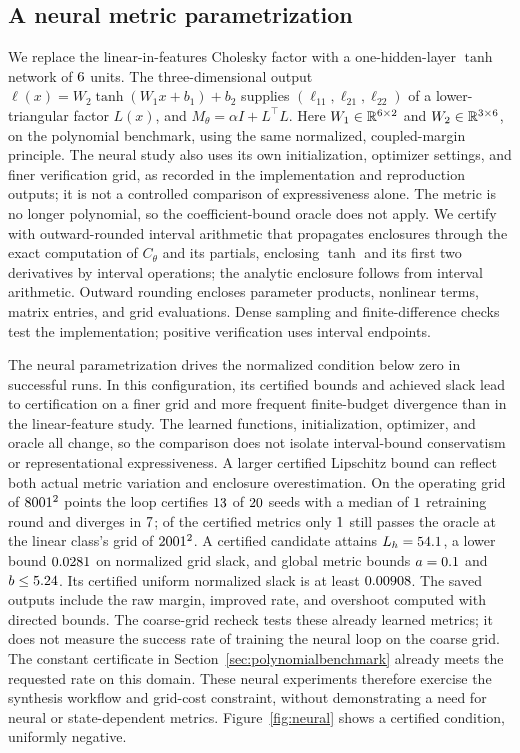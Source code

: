 \documentclass[12pt,onecolumn,journal]{IEEEtran}
\newcommand{\R}{\mathbb{R}}
\begin{document}
\subsection{A neural metric parametrization}
\label{sec:neural}

We replace the linear-in-features Cholesky factor with a one-hidden-layer $\tanh$ network of $6$ units. The three-dimensional output $\ell(x)=W_2\tanh(W_1x+b_1)+b_2$ supplies $(\ell_{11},\ell_{21},\ell_{22})$ of a lower-triangular factor $L(x)$, and $M_\theta=\alpha I+L^\top L$. Here $W_1\in\R^{\numNeuralUnits\times2}$ and $W_2\in\R^{3\times\numNeuralUnits}$, on the polynomial benchmark, using the same normalized, coupled-margin principle. The neural study also uses its own initialization, optimizer settings, and finer verification grid, as recorded in the implementation and reproduction outputs; it is not a controlled comparison of expressiveness alone. The metric is no longer polynomial, so the coefficient-bound oracle does not apply. We certify with outward-rounded interval arithmetic that propagates enclosures through the exact computation of $C_\theta$ and its partials, enclosing $\tanh$ and its first two derivatives by interval operations; the analytic enclosure follows from interval arithmetic. Outward rounding encloses parameter products, nonlinear terms, matrix entries, and grid evaluations. Dense sampling and finite-difference checks test the implementation; positive verification uses interval endpoints.

The neural parametrization drives the normalized condition below zero in successful runs. In this configuration, its certified bounds and achieved slack lead to certification on a finer grid and more frequent finite-budget divergence than in the linear-feature study. The learned functions, initialization, optimizer, and oracle all change, so the comparison does not isolate interval-bound conservatism or representational expressiveness. A larger certified Lipschitz bound can reflect both actual metric variation and enclosure overestimation. On the operating grid of $8001^2$ points the loop certifies $13$ of $20$ seeds with a median of $1$ retraining round and diverges in $7$; of the certified metrics only $1$ still passes the oracle at the linear class's grid of $2001^2$. A certified candidate attains $L_h=54.1$, a lower bound $0.0281$ on normalized grid slack, and global metric bounds $a=0.1$ and $b\le5.24$. Its certified uniform normalized slack is at least $0.00908$. The saved outputs include the raw margin, improved rate, and overshoot computed with directed bounds. The coarse-grid recheck tests these already learned metrics; it does not measure the success rate of training the neural loop on the coarse grid. The constant certificate in Section~\ref{sec:polynomialbenchmark} already meets the requested rate on this domain. These neural experiments therefore exercise the synthesis workflow and grid-cost constraint, without demonstrating a need for neural or state-dependent metrics. Figure~\ref{fig:neural} shows a certified condition, uniformly negative.
\end{document}
